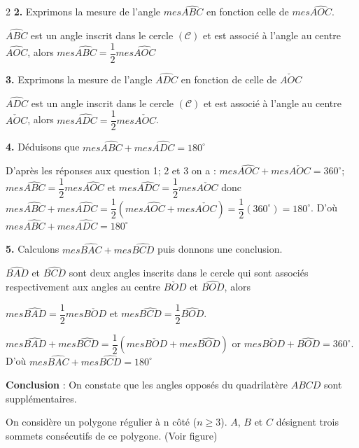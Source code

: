 \begin{multicols*}{2}
  	\textbf{2.} Exprimons la 	mesure de l’angle $mes\widehat{ABC}$ en fonction celle de    $mes\widehat{AOC}$.
  	
  	$\widehat{ABC}$ est un angle inscrit dans le cercle $\mathcal{(C)}$ et est associé à l'angle au centre $\widehat{AOC}$, alors $mes\widehat{ABC}=\dfrac{1}{2} mes\widehat{AOC}$
  	
  	\textbf{3.} Exprimons la mesure de l’angle $\widehat{ADC}$ en fonction de celle de $\check{AOC}$
  	
  	$\widehat{ADC}$ est un angle inscrit dans le cercle $\mathcal{(C)}$ et est associé à l'angle au centre $\check{AOC}$, alors $mes\widehat{ADC}=\dfrac{1}{2} mes\check{AOC}$.
  	
  	\textbf{4.}  Déduisons que $mes\widehat{ABC}+mes\widehat{ADC}=180^\circ$
  	
  	D'après les réponses aux question 1; 2 et 3 on a :
  	$mes\widehat{AOC}+ mes\check{AOC}=360^\circ$; $mes\widehat{ABC}=\dfrac{1}{2} mes\widehat{AOC}$ et $mes\widehat{ADC}=\dfrac{1}{2} mes\check{AOC}$ donc $mes\widehat{ABC}+mes\widehat{ADC}= \dfrac{1}{2}(mes\widehat{AOC}+ mes\check{AOC}) =\dfrac{1}{2}(360^\circ)=180^\circ$. D'où $mes\widehat{ABC}+mes\widehat{ADC}=180^\circ$
  	
  	\textbf{5.}  Calculons  $mes\widehat{BAC}+mes\widehat{BCD}$ puis donnons une conclusion.
  	
  	$\widehat{BAD}$ et $\widehat{BCD}$ sont deux angles inscrits dans le cercle qui sont associés respectivement aux angles au centre $\check{BOD}$ et $\widehat{BOD}$, alors 
  	
  	$mes\widehat{BAD}=\dfrac{1}{2}mes\check{BOD}$ et $mes\widehat{BCD}=\dfrac{1}{2}\widehat{BOD}$.
  	
  	$mes\widehat{BAD}+mes\widehat{BCD}=\dfrac{1}{2}(mes\check{BOD}+mes\widehat{BOD})$ or $mes\check{BOD}+\widehat{BOD}=360^\circ$. D'où  $mes\widehat{BAC}+mes\widehat{BCD}=180^\circ$
  	
  	\textbf{Conclusion} : On constate que les angles opposés du quadrilatère $ABCD$ sont supplémentaires.
  	
  	
  	On considère un polygone régulier à n côté ($n\geqslant 3$). $A$, $B$ et $C $ désignent trois sommets 
  	consécutifs de ce polygone. (Voir figure)
  	

\end{multicols*}
